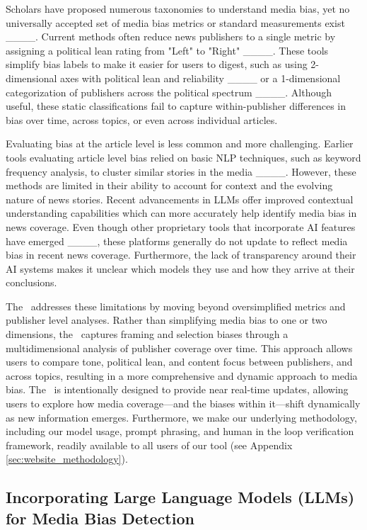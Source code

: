 Scholars have proposed numerous taxonomies to understand media bias, yet no universally accepted set of media bias metrics or standard measurements exist ____. Current methods often reduce news publishers to a single metric by assigning a political lean rating from "Left" to "Right" ____. These tools simplify bias labels to make it easier for users to digest, such as using 2-dimensional axes with political lean and reliability ____ or a 1-dimensional categorization of publishers across the political spectrum ____. Although useful, these static classifications fail to capture within-publisher differences in bias over time, across topics, or even across individual articles. 

Evaluating bias at the article level is less common and more challenging. Earlier tools evaluating article level bias relied on basic NLP techniques, such as keyword frequency analysis, to cluster similar stories in the media ____. However, these methods are limited in their ability to account for context and the evolving nature of news stories. Recent advancements in LLMs offer improved contextual understanding capabilities which can more accurately help identify media bias in news coverage. Even though other proprietary tools that incorporate AI features have emerged ____, these platforms generally do not update to reflect media bias in recent news coverage. Furthermore, the lack of transparency around their AI systems makes it unclear which models they use and how they arrive at their conclusions.

The \mbd\ addresses these limitations by moving beyond oversimplified metrics and publisher level analyses. Rather than simplifying media bias to one or two dimensions, the \mbd\ captures framing and selection biases through a multidimensional analysis of publisher coverage over time. This approach allows users to compare tone, political lean, and content focus between publishers, and across topics, resulting in a more comprehensive and dynamic approach to media bias. The \mbd\ is intentionally designed to provide near real-time updates, allowing users to explore how media coverage---and the biases within it---shift dynamically as new information emerges. Furthermore, we make our underlying methodology, including our model usage, prompt phrasing, and human in the loop verification framework, readily available to all users of our tool (see Appendix \ref{sec:website_methodology}).

\subsection{Incorporating Large Language Models (LLMs) for Media Bias Detection}
\label{sec:relate_work_llm_bias}

